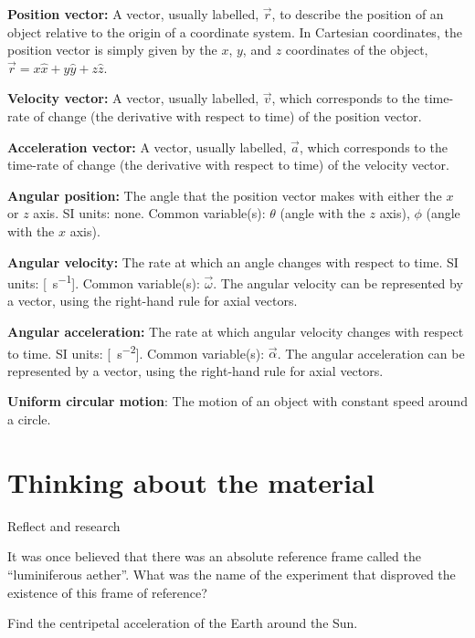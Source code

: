 \begin{definitions}
    \textbf{Position vector:} A vector, usually labelled, $\vec r$, to describe the position of an object relative to the origin of a coordinate system. In Cartesian coordinates, the position vector is simply given by the $x$, $y$, and $z$ coordinates of the object, $\vec r = x\hat x + y \hat y+ z\hat z$.

    \item \textbf{Velocity vector:} A vector, usually labelled, $\vec v$, which corresponds to the time-rate of change (the derivative with respect to time) of the position vector.

    \item \textbf{Acceleration vector:} A vector, usually labelled, $\vec a$, which corresponds to the time-rate of change (the derivative with respect to time) of the velocity vector.

	\item \textbf{Angular position:} The angle that the position vector makes with either the $x$ or $z$ axis. SI units: none. Common variable(s): $\theta$ (angle with the $z$ axis), $\phi$ (angle with the $x$ axis).

	\item \textbf{Angular velocity:} The rate at which an angle changes with respect to time. SI units: [\SI{}{s^{-1}}]. Common variable(s): $\vec \omega$. The angular velocity can be represented by a vector, using the right-hand rule for axial vectors.

	\item \textbf{Angular acceleration:} The rate at which angular velocity changes with respect to time. SI units: [\SI{}{s^{-2}}]. Common variable(s): $\vec \alpha$. The angular acceleration can be represented by a vector, using the right-hand rule for axial vectors. 

	\item \textbf{Uniform circular motion}: The motion of an object with constant speed around a circle.
\end{definitions}

\newpage
\section{Thinking about the material}

\begin{chapteractivity}{Reflect and research}
{
\item It was once believed that there was an absolute reference frame called the ``luminiferous aether''. What was the name of the experiment that disproved the existence of this frame of reference?
\item Find the centripetal acceleration of the Earth around the Sun.
}
\end{chapteractivity}


